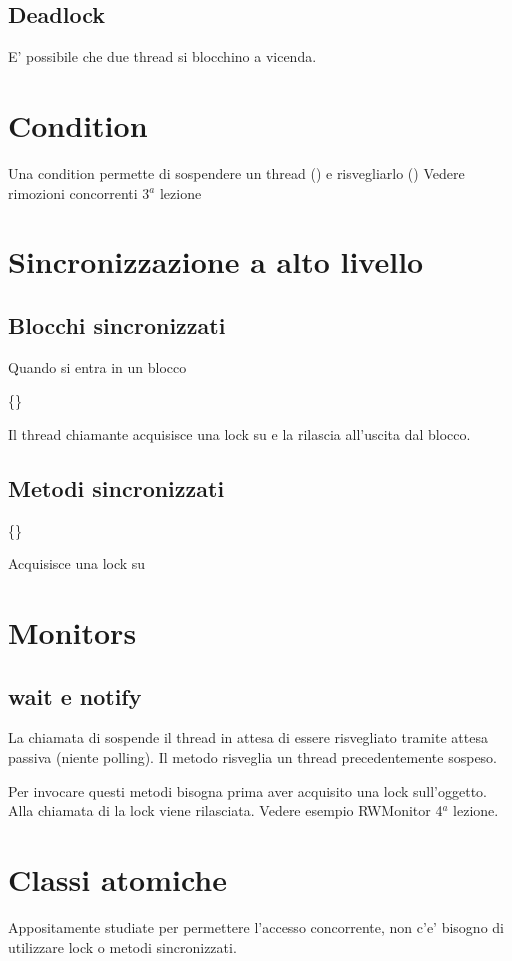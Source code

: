 \subsection{Deadlock}
E' possibile che due thread si blocchino a vicenda.
\section{Condition}
Una condition permette di sospendere un thread () e risvegliarlo ()
Vedere rimozioni concorrenti 3$^a$ lezione
\section{Sincronizzazione a alto livello}
\subsection{Blocchi sincronizzati}
Quando si entra in un blocco 
\begin{center}
    \{\}
\end{center}
Il thread chiamante acquisisce una lock su  e la rilascia all'uscita dal blocco.
\subsection{Metodi sincronizzati}
\begin{center}
    \{\}
\end{center}
Acquisisce una lock su 
\section{Monitors}
\subsection{wait e notify}
La chiamata di  sospende il thread in attesa di essere risvegliato tramite attesa passiva (niente polling).
Il metodo  risveglia un thread precedentemente sospeso.

Per invocare questi metodi bisogna prima aver acquisito una lock sull'oggetto.
Alla chiamata di  la lock viene rilasciata.
Vedere esempio RWMonitor 4$^a$ lezione.
\section{Classi atomiche}
Appositamente studiate per permettere l'accesso concorrente, non c'e' bisogno di utilizzare lock o metodi sincronizzati.
